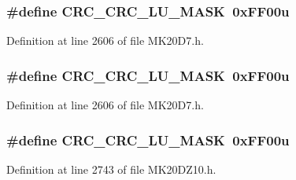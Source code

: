 \subsubsection[{\texorpdfstring{C\+R\+C\+\_\+\+C\+R\+C\+\_\+\+L\+U\+\_\+\+M\+A\+SK}{CRC_CRC_LU_MASK}}]{\setlength{\rightskip}{0pt plus 5cm}\#define C\+R\+C\+\_\+\+C\+R\+C\+\_\+\+L\+U\+\_\+\+M\+A\+SK~0x\+F\+F00u}\hypertarget{group___c_r_c___register___masks_gafd70dfedcb7a56d90936b633f6b72c8b}{}\label{group___c_r_c___register___masks_gafd70dfedcb7a56d90936b633f6b72c8b}


Definition at line 2606 of file M\+K20\+D7.\+h.

\subsubsection[{\texorpdfstring{C\+R\+C\+\_\+\+C\+R\+C\+\_\+\+L\+U\+\_\+\+M\+A\+SK}{CRC_CRC_LU_MASK}}]{\setlength{\rightskip}{0pt plus 5cm}\#define C\+R\+C\+\_\+\+C\+R\+C\+\_\+\+L\+U\+\_\+\+M\+A\+SK~0x\+F\+F00u}\hypertarget{group___c_r_c___register___masks_gafd70dfedcb7a56d90936b633f6b72c8b}{}\label{group___c_r_c___register___masks_gafd70dfedcb7a56d90936b633f6b72c8b}


Definition at line 2606 of file M\+K20\+D7.\+h.

\subsubsection[{\texorpdfstring{C\+R\+C\+\_\+\+C\+R\+C\+\_\+\+L\+U\+\_\+\+M\+A\+SK}{CRC_CRC_LU_MASK}}]{\setlength{\rightskip}{0pt plus 5cm}\#define C\+R\+C\+\_\+\+C\+R\+C\+\_\+\+L\+U\+\_\+\+M\+A\+SK~0x\+F\+F00u}\hypertarget{group___c_r_c___register___masks_gafd70dfedcb7a56d90936b633f6b72c8b}{}\label{group___c_r_c___register___masks_gafd70dfedcb7a56d90936b633f6b72c8b}


Definition at line 2743 of file M\+K20\+D\+Z10.\+h.

